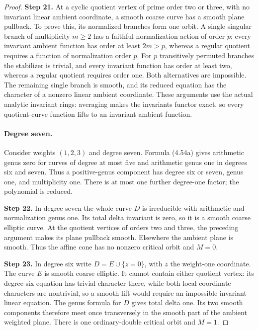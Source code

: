 \begin{proof}
\noindent\textbf{Step 21.} At a cyclic quotient vertex of prime order two
or three, with no invariant linear ambient
coordinate, a smooth coarse curve has a smooth
plane pullback. To prove this, its normalized
branches form one orbit. A single singular
branch of multiplicity $m\ge2$ has a faithful
normalization action of order $p$; every invariant
ambient function has order at least $2m>p$,
whereas a regular quotient requires a function
of normalization order $p$. For $p$ transitively
permuted branches the stabilizer is trivial,
and every invariant function has order at least
two, whereas a regular quotient requires order
one. Both alternatives are impossible. The
remaining single branch is smooth, and its
reduced equation has the character of a nonzero
linear ambient coordinate. These arguments
use the actual analytic invariant rings:
averaging makes the invariants functor exact,
so every quotient-curve function lifts to an
invariant ambient function.

\paragraph{Degree seven.}
Consider weights $(1,2,3)$ and degree seven.
Formula (4.54a) gives arithmetic genus zero for
curves of degree at most five and arithmetic
genus one in degrees six and seven. Thus a
positive-genus component has degree six or
seven, genus one, and multiplicity one. There
is at most one further degree-one factor;
the polynomial is reduced.

\noindent\textbf{Step 22.} In degree seven the whole curve $D$ is
irreducible with arithmetic and normalization
genus one. Its total delta invariant is zero,
so it is a smooth coarse elliptic curve.
At the quotient vertices of orders two and
three, the preceding argument makes its plane
pullback smooth. Elsewhere the ambient plane
is smooth. Thus the affine cone has no
nonzero critical orbit and $M=0$.

\noindent\textbf{Step 23.} In degree six write $D=E\cup\{z=0\}$, with
$z$ the weight-one coordinate. The curve $E$
is smooth coarse elliptic. It cannot contain
either quotient vertex: its degree-six
equation has trivial character there, while
both local-coordinate characters are
nontrivial, so a smooth lift would require
an impossible invariant linear equation.
The genus formula for $D$ gives total delta
one. Its two smooth components therefore
meet once transversely in the smooth part
of the ambient weighted plane. There is
one ordinary-double critical orbit and
$M=1$.


\end{proof}
